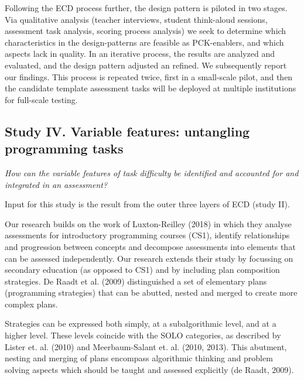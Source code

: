 Following the ECD process further, the design pattern is piloted in two stages. Via qualitative analysis (teacher interviews, student think-aloud sessions, assessment task analysis, scoring process analysis) we seek to determine which characteristics in the design-patterns are feasible as PCK-enablers, and which aspects lack in quality. In an iterative process, the results are analyzed and evaluated, and the design pattern adjusted an refined. We subsequently report our findings. This process is repeated twice, first in a small-scale pilot, and then the candidate template assessment tasks will be deployed at multiple institutions for full-scale testing.


\subsection{Study IV. Variable features: untangling programming tasks}
\textit{How can the variable features of task difficulty be identified and accounted for and integrated in an assessment?}

Input for this study is the result from the outer three layers of ECD (study II).

Our research builds on the work of Luxton-Reilley (2018) in which they analyse assessments for introductory programming courses (CS1), identify relationships and progression between concepts and decompose assessments into elements that can be assessed independently. Our research extends their study by focussing on secondary education (as opposed to CS1) and by including plan composition strategies. De Raadt et al. (2009) distinguished a set of elementary plans (programming strategies) that can be abutted, nested and merged to create more complex plans.





 Strategies can be expressed both simply, at a subalgorithmic level, and at a higher level. These levels coincide with the SOLO categories, as described by Lister et. al. (2010) and Meerbaum-Salant et. al. (2010, 2013). This abutment, nesting and merging of plans encompass algorithmic thinking and problem solving aspects which should be taught and assessed explicitly (de Raadt, 2009).




